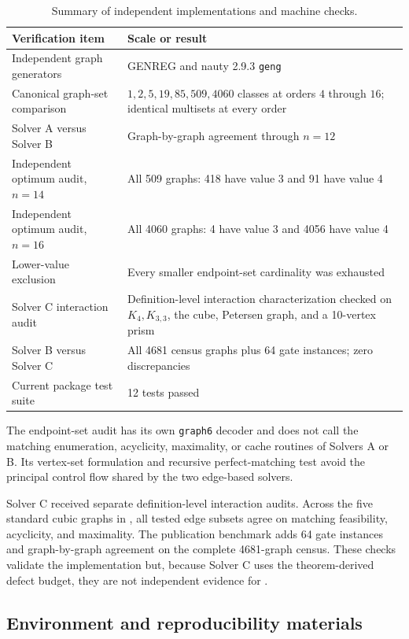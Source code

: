 \documentclass[smallextended,natbib,nospthms]{svjour3}
\theoremstyle{definition}
\theoremstyle{remark}
\begin{document}
\begin{table}[t]
\centering
\caption{Summary of independent implementations and machine checks.}
\label{tab:verification}
\begin{tabularx}{\textwidth}{>{\raggedright\arraybackslash}p{}X}
\toprule
Verification item & Scale or result\\
\midrule
Independent graph generators &
GENREG and nauty 2.9.3 \texttt{geng}\\
Canonical graph-set comparison &
$1,2,5,19,85,509,4060$ classes at orders $4$ through $16$; identical
multisets at every order\\
Solver A versus Solver B &
Graph-by-graph agreement through $n=12$\\
Independent optimum audit, $n=14$ &
All 509 graphs: 418 have value 3 and 91 have value 4\\
Independent optimum audit, $n=16$ &
All 4060 graphs: 4 have value 3 and 4056 have value 4\\
Lower-value exclusion &
Every smaller endpoint-set cardinality was exhausted\\
Solver C interaction audit &
Definition-level interaction characterization checked on
$K_4,K_{3,3}$, the cube, Petersen graph, and a 10-vertex prism\\
Solver B versus Solver C &
All 4681 census graphs plus 64 gate instances; zero discrepancies\\
Current package test suite &
12 tests passed\\
\bottomrule
\end{tabularx}
\end{table}

The endpoint-set audit has its own \texttt{graph6} decoder and does not call the
matching enumeration, acyclicity, maximality, or cache routines of Solvers A
or B. Its vertex-set formulation and recursive perfect-matching test avoid
the principal control flow shared by the two edge-based solvers.

Solver C received separate definition-level interaction audits. Across the
five standard cubic graphs in , all tested edge subsets
agree on matching feasibility, acyclicity, and maximality. The publication
benchmark adds 64 gate instances and graph-by-graph agreement on the complete
4681-graph census. These checks validate the implementation but, because
Solver C uses the theorem-derived defect budget, they are not independent
evidence for .

\subsection{Environment and reproducibility materials}
\end{document}
